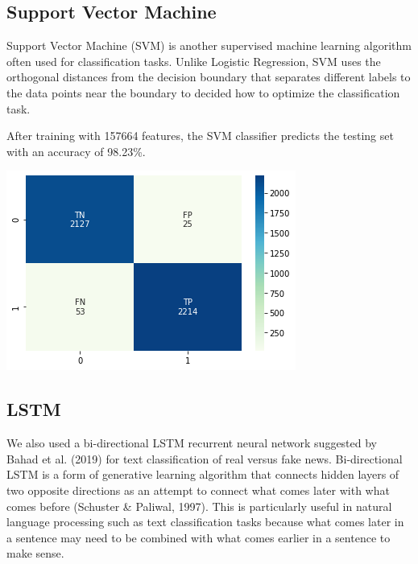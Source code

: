 \documentclass{article}
\begin{document}
\begin{multicols}{2}
\subsection{Support Vector Machine}
Support Vector Machine (SVM) is another supervised machine learning algorithm often used for classification tasks. Unlike Logistic Regression, SVM uses the orthogonal distances from the decision boundary that separates different labels to the data points near the boundary to decided how to optimize the classification task. 

After training with 157664 features, the SVM classifier predicts the testing set with an accuracy of 98.23\%.

\begin{center}
\includegraphics[scale=0.4]{images/svmcm.png}
\end{center}

\subsection{LSTM}
We also used a bi-directional LSTM recurrent neural network suggested by Bahad et al. (2019) for text classification of real versus fake news. Bi-directional LSTM is a form of generative learning algorithm that connects hidden layers of two opposite directions as an attempt to connect what comes later with what comes before (Schuster \& Paliwal, 1997). This is particularly useful in natural language processing such as text classification tasks because what comes later in a sentence may need to be combined with what comes earlier in a sentence to make sense.


\end{multicols}
\end{document}
